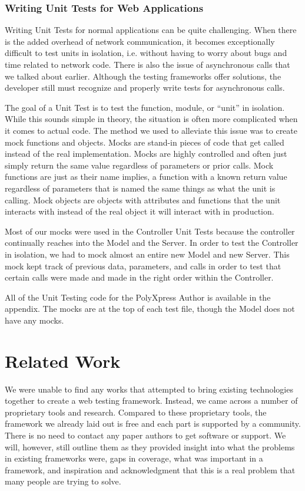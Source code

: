 \documentclass[12pt]{ucthesis}
\begin{document}
\subsection{Writing Unit Tests for Web Applications}
Writing Unit Tests for normal applications can be quite challenging. When there is the added overhead of network communication, it becomes exceptionally difficult to test units in isolation, i.e. without having to worry about bugs and time related to network code. There is also the issue of asynchronous calls that we talked about earlier. Although the testing frameworks offer solutions, the developer still must recognize and properly write tests for asynchronous calls.

The goal of a Unit Test is to test the function, module, or ``unit'' in isolation. While this sounds simple in theory, the situation is often more complicated when it comes to actual code. The method we used to alleviate this issue was to create mock functions and objects. Mocks are stand-in pieces of code that get called instead of the real implementation. Mocks are highly controlled and often just simply return the same value regardless of parameters or prior calls. Mock functions are just as their name implies, a function with a known return value regardless of parameters that is named the same things as what the unit is calling. Mock objects are objects with attributes and functions that the unit interacts with instead of the real object it will interact with in production.

Most of our mocks were used in the Controller Unit Tests because the controller continually reaches into the Model and the Server. In order to test the Controller in isolation, we had to mock almost an entire new Model and new Server. This mock kept track of previous data, parameters, and calls in order to test that certain calls were made and made in the right order within the Controller.

All of the Unit Testing code for the PolyXpress Author is available in the appendix. The mocks are at the top of each test file, though the Model does not have any mocks.

\chapter{Related Work}
We were unable to find any works that attempted to bring existing technologies together to create a web testing framework. Instead, we came across a number of proprietary tools and research. Compared to these proprietary tools, the framework we already laid out is free and each part is supported by a community. There is no need to contact any paper authors to get software or support. We will, however, still outline them as they provided insight into what the problems in existing frameworks were, gaps in coverage, what was important in a framework, and inspiration and acknowledgment that this is a real problem that many people are trying to solve.
\end{document}
